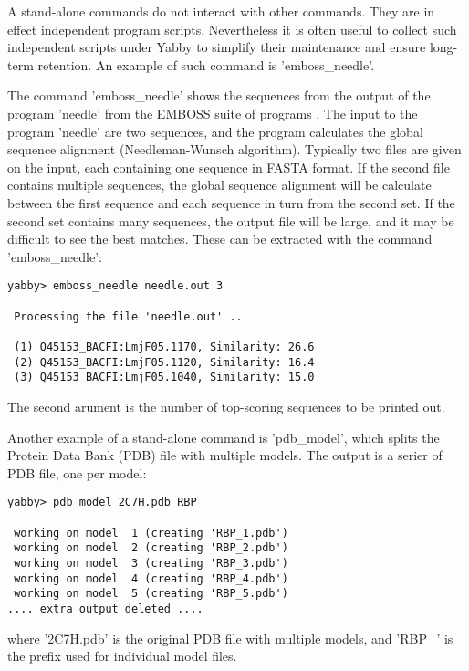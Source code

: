 A stand-alone commands do not interact with other commands. They
are in effect independent program scripts.  Nevertheless it is
often useful to collect such independent scripts under Yabby
to simplify their maintenance and ensure long-term retention.
An example of such command is 'emboss\_needle'.


The command 'emboss\_needle' shows the sequences from the output
of the program 'needle' from the EMBOSS suite of programs
\cite{emboss}. The input to the program 'needle' are two
sequences, and the program calculates the global sequence
alignment (Needleman-Wunsch algorithm). Typically two files
are given on the input, each containing one sequence in FASTA  
format. If the second file contains multiple sequences,
the global sequence alignment will be calculate between
the first sequence and each sequence in turn from the
second set. If the second set contains many sequences, the
output file will be large, and it may be difficult to see
the best matches. These can be extracted with the command
'emboss\_needle':

\begin{verbatim}
yabby> emboss_needle needle.out 3

 Processing the file 'needle.out' ..

 (1) Q45153_BACFI:LmjF05.1170, Similarity: 26.6
 (2) Q45153_BACFI:LmjF05.1120, Similarity: 16.4
 (3) Q45153_BACFI:LmjF05.1040, Similarity: 15.0
\end{verbatim}

The second arument is the number of top-scoring sequences
to be printed out.


Another example of a stand-alone command is 'pdb\_model', which 
splits the Protein Data Bank (PDB) file with multiple models.
The output is a serier of PDB file, one per model:

\begin{verbatim}
yabby> pdb_model 2C7H.pdb RBP_

 working on model  1 (creating 'RBP_1.pdb')
 working on model  2 (creating 'RBP_2.pdb')
 working on model  3 (creating 'RBP_3.pdb')
 working on model  4 (creating 'RBP_4.pdb')
 working on model  5 (creating 'RBP_5.pdb')
.... extra output deleted ....
\end{verbatim}

where '2C7H.pdb' is the original PDB file with multiple models,
and 'RBP\_' is the prefix used for individual model files.

